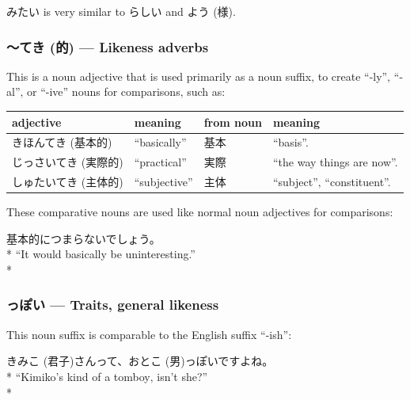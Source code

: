 \documentclass[11pt, b5paper, twoside, openright, onecolumn]{book}
\makeatletter
\newcommand*{\rtrubystack}[2]{{\relscale{0.5}%
  \begin{tabular}[b]{@{}c@{}}%
    {#1}\\%
    {\textscale{2}{#2}}%
  \end{tabular}}%
}
\DeclareRobustCommand*{\rtruby}[2]{%
  \mbox{%
    \setlength{\parskip}{0ex}%
    \BeginAccSupp{method=pdfstringdef,ActualText={#1}}%
      \rtrubystack{\phantom{#2}}{#1}%
      \llap{%
        \rtrubystack{#2}{\phantom{#1}}%
      }%
    \EndAccSupp{}%
  }%
}
\newcommand*{\rubystack}[2]{{\relscale{0.5}%
  \begin{tabular}[b]{@{}c@{}}%
    {#1}\\%
   {\textscale{2}{#2}}%
  \end{tabular}}%
}
\DeclareRobustCommand*{\ruby}[2]{%
  \mbox{%
    \setlength{\parskip}{0ex}%
    \BeginAccSupp{method=pdfstringdef,ActualText={#1}}%
      \rubystack{\phantom{#2}}{#1}%
      \llap{%
        \rubystack{#2}{\phantom{#1}}%
      }%
    \EndAccSupp{}%
  }%
}
\renewcommand*{\rtruby}[2]{#2 (#1)}%
\renewcommand*{\ruby}[2]{#2 (#1)}%
\newenvironment{exampleblock}{
\setlength{\parindent}{0.6in}
\begin{minipage}[t]{\dimexpr\textwidth-\parindent}}
{\end{minipage}}
\newenvironment{mytabular}[1]{\noindent\hspace{0.4in}
\begin{tabular}[h]{#1}}{\end{tabular}}
\makeatother
\begin{document}
みたい is very similar to らしい and \ruby{様}{よう}.

\subsubsection{～\ruby{的}{てき} — Likeness adverbs}

This is a noun adjective that is used primarily as a noun suffix‚ to create “-ly”‚ “-al”‚ or “-ive” nouns for comparisons‚ such as:

\vspace{0.5cm}
\smaller
\begin{mytabular}{| l  l  l  l |}\hline 
\rule{0pt}{2.4ex}adjective & meaning & from noun & meaning\\ 
\hline
\rule{0pt}{3.6ex}\rtruby{基本的}{きほんてき} & “basically” & 基本 & “basis”.\\ 
\rule{0pt}{3.6ex}\rtruby{実際的}{じっさいてき} & “practical” & 実際 & “the way things are now”.\\ 
\rule{0pt}{3.6ex}\rtruby{主体的}{しゅたいてき} & “subjective” & 主体 & “subject”‚ “constituent”.\\ 
\hline 
\end{mytabular}
\larger
\vspace{0.5cm}


These comparative nouns are used like normal noun adjectives for comparisons:

\vspace{0.4cm}
\begin{exampleblock}
基本的につまらないでしょう。 \\* 
“It would basically be uninteresting.” \\* 
\end{exampleblock}
\subsubsection{っぽい — Traits‚ general likeness}


This noun suffix is comparable to the English suffix “-ish”:

\vspace{0.4cm}
\begin{exampleblock}
\ruby{君子}{きみこ}さんって、\ruby{男}{おとこ}っぽいですよね。 \\* 
“Kimiko’s kind of a tomboy‚ isn’t she?” \\* 
\end{exampleblock}
\vspace{0.2cm}
\end{document}
